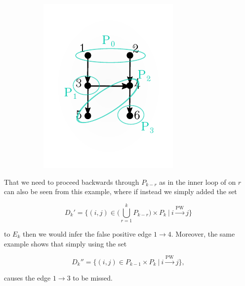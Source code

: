 \documentclass[12pt]{article}
\def\pwgc{\overset{\text{PW}}{\rightarrow}}  %
\begin{document}
\begin{example}
\begin{figure}
\begin{subfigure}[b]{0.45\textwidth}
      \includegraphics[width=\linewidth]{example_algorithm2.pdf}
    \end{subfigure}
  \end{figure}

  That we need to proceed backwards through $P_{k - r}$ as in the
  inner loop of on $r$ can also be seen from this example, where if
  instead we simply added the set

  \begin{equation*}
    D_k' = \{(i, j) \in \Big(\bigcup_{r = 1}^k P_{k - r}\Big) \times P_k\ |\ i \pwgc j \}
  \end{equation*}

  to $E_k$ then we would infer the false positive edge
  $1 \rightarrow 4$.  Moreover, the same example shows that simply
  using the set

  \begin{equation*}
    D_k'' = \{(i, j) \in P_{k - 1} \times P_k\ |\ i \pwgc j \}  ,
  \end{equation*}

  causes the edge $1 \rightarrow 3$ to be missed.
\end{example}
\end{document}
